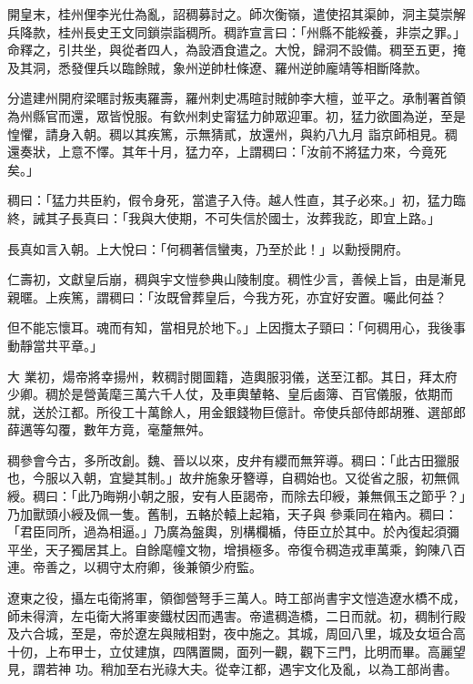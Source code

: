 \begin{pinyinscope}
 開皇末，桂州俚李光仕為亂，詔稠募討之。師次衡嶺，遣使招其渠帥，洞主莫崇解兵降款，桂州長史王文同鎖崇詣稠所。稠詐宣言曰：「州縣不能綏養，非崇之罪。」命釋之，引共坐，與從者四人，為設酒食遣之。大悅，歸洞不設備。稠至五更，掩及其洞，悉發俚兵以臨餘賊，象州逆帥杜條遼、羅州逆帥龐靖等相斷降款。



 分遣建州開府梁暱討叛夷羅壽，羅州刺史馮暄討賊帥李大檀，並平之。承制署首領為州縣官而還，眾皆悅服。有欽州刺史甯猛力帥眾迎軍。初，猛力欲圖為逆，至是惶懼，請身入朝。稠以其疾篤，示無猜貳，放還州，與約八九月
 詣京師相見。稠還奏狀，上意不懌。其年十月，猛力卒，上謂稠曰：「汝前不將猛力來，今竟死矣。」



 稠曰：「猛力共臣約，假令身死，當遣子入侍。越人性直，其子必來。」初，猛力臨終，誡其子長真曰：「我與大使期，不可失信於國士，汝葬我訖，即宜上路。」



 長真如言入朝。上大悅曰：「何稠著信蠻夷，乃至於此！」以勳授開府。



 仁壽初，文獻皇后崩，稠與宇文愷參典山陵制度。稠性少言，善候上旨，由是漸見親暱。上疾篤，謂稠曰：「汝既曾葬皇后，今我方死，亦宜好安置。囑此何益？



 但不能忘懷耳。魂而有知，當相見於地下。」上因攬太子頸曰：「何稠用心，我後事動靜當共平章。」



 大
 業初，煬帝將幸揚州，敕稠討閱圖籍，造輿服羽儀，送至江都。其日，拜太府少卿。稠於是營黃麾三萬六千人仗，及車輿輦輅、皇后鹵簿、百官儀服，依期而就，送於江都。所役工十萬餘人，用金銀錢物巨億計。帝使兵部侍郎胡雅、選部郎薛邁等勾覆，數年方竟，毫釐無舛。



 稠參會今古，多所改創。魏、晉以以來，皮弁有纓而無笄導。稠曰：「此古田獵服也，今服以入朝，宜變其制。」故弁施象牙簪導，自稠始也。又從省之服，初無佩綬。稠曰：「此乃晦朔小朝之服，安有人臣謁帝，而除去印綬，兼無佩玉之節乎？」乃加獸頭小綬及佩一隻。舊制，五輅於轅上起箱，天子與
 參乘同在箱內。稠曰：「君臣同所，過為相逼。」乃廣為盤輿，別構欄楯，侍臣立於其中。於內復起須彌平坐，天子獨居其上。自餘麾幢文物，增損極多。帝復令稠造戎車萬乘，鉤陳八百連。帝善之，以稠守太府卿，後兼領少府監。



 遼東之役，攝左屯衛將軍，領御營弩手三萬人。時工部尚書宇文愷造遼水橋不成，師未得濟，左屯衛大將軍麥鐵杖因而遇害。帝遣稠造橋，二日而就。初，稠制行殿及六合城，至是，帝於遼左與賊相對，夜中施之。其城，周回八里，城及女垣合高十仞，上布甲士，立仗建旗，四隅置闕，面列一觀，觀下三門，比明而畢。高麗望見，謂若神
 功。稍加至右光祿大夫。從幸江都，遇宇文化及亂，以為工部尚書。




\end{pinyinscope}
